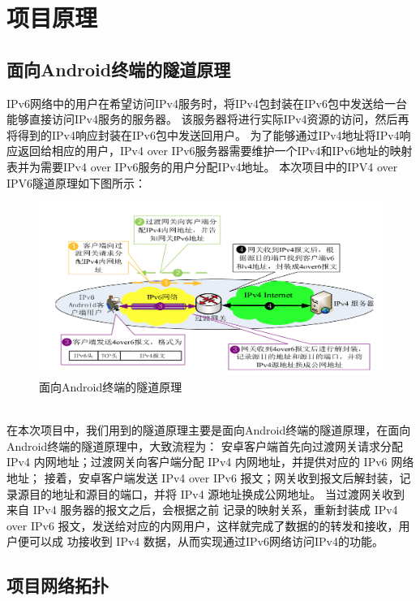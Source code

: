 \chapter{项目原理}
\label{chap:SomeStuff}


\section{面向Android终端的隧道原理}

IPv6网络中的用户在希望访问IPv4服务时，将IPv4包封装在IPv6包中发送给一台能够直接访问IPv4服务的服务器。
该服务器将进行实际IPv4资源的访问，然后再将得到的IPv4响应封装在IPv6包中发送回用户。
为了能够通过IPv4地址将IPv4响应返回给相应的用户，IPv4 over IPv6服务器需要维护一个IPv4和IPv6地址的映射表并为需要IPv4 over IPv6服务的用户分配IPv4地址。
本次项目中的IPV4 over IPV6隧道原理如下图所示：
\begin{figure}[!ht]
	\begin{center}
	\includegraphics[scale=.58]{4over6.png}
	\end{center}
	\caption{面向Android终端的隧道原理}
	\label{figure:4over6}
\end{figure}
\\ 在本次项目中，我们用到的隧道原理主要是面向Android终端的隧道原理，在面向Android终端的隧道原理中，大致流程为：
安卓客户端首先向过渡网关请求分配 IPv4 内网地址；过渡网关向客户端分配 IPv4 内网地址，并提供对应的 IPv6 网络地址；
接着，安卓客户端发送 IPv4 over IPv6 报文；网关收到报文后解封装，记录源目的地址和源目的端口，并将 IPv4 源地址换成公网地址。
当过渡网关收到来自 IPv4 服务器的报文之后，会根据之前 记录的映射关系，重新封装成 IPv4 over IPv6 报文，发送给对应的内网用户，这样就完成了数据的的转发和接收，用户便可以成 功接收到 IPv4 数据，从而实现通过IPv6网络访问IPv4的功能。


\section{项目网络拓扑}

